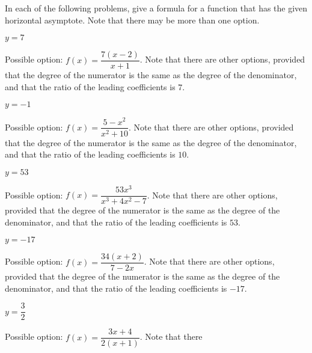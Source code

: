 \begin{exercises}
 \begin{problem}
 In each of the following problems, give a formula for a function that 
 has the given horizontal asymptote. Note that there may be more than one option.
 \begin{multicols}{4}
 	\begin{subproblem}
 		$y=7$ 
 		\begin{shortsolution}
 			Possible option: $f(x)=\dfrac{7(x-2)}{x+1}$. Note that there
 			are other options, provided that the degree of the numerator is the same as the degree
 			of the denominator, and that the ratio of the leading 
 			coefficients is $7$.
 		\end{shortsolution}
 	\end{subproblem}
 	\begin{subproblem}
 		$y=-1$ 
 		\begin{shortsolution}
 			Possible option: $f(x)=\dfrac{5-x^2}{x^2+10}$. Note that there
 			are other options, provided that the degree of the numerator is the same as the degree
 			of the denominator, and that the ratio of the leading 
 			coefficients is $10$.
 		\end{shortsolution}
 	\end{subproblem}
 	\begin{subproblem}
 		$y=53$ 
 		\begin{shortsolution}
 			Possible option: $f(x)=\dfrac{53x^3}{x^3+4x^2-7}$. Note that there
 			are other options, provided that the degree of the numerator is the same as the degree
 			of the denominator, and that the ratio of the leading 
 			coefficients is $53$.
 		\end{shortsolution}
 	\end{subproblem}
 	\begin{subproblem}
 		$y=-17$ 
 		\begin{shortsolution}
 			Possible option: $f(x)=\dfrac{34(x+2)}{7-2x}$. Note that there
 			are other options, provided that the degree of the numerator is the same as the degree
 			of the denominator, and that the ratio of the leading 
 			coefficients is $-17$.
 		\end{shortsolution}
 	\end{subproblem}
 	\begin{subproblem}
 		$y=\dfrac{3}{2}$ 
 		\begin{shortsolution}
 			Possible option: $f(x)=\dfrac{3x+4}{2(x+1)}$. Note that there

\end{shortsolution}
\end{subproblem}
\end{multicols}
\end{problem}
\end{exercises}
